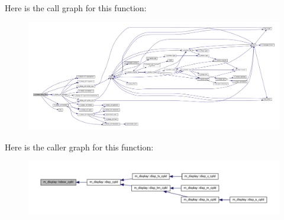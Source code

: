 Here is the call graph for this function\+:
\nopagebreak
\begin{figure}[H]
\begin{center}
\leavevmode
\includegraphics[width=350pt]{namespacem__display_ac4ed462092efa64e5ce8454e7a752d10_cgraph}
\end{center}
\end{figure}
Here is the caller graph for this function\+:
\nopagebreak
\begin{figure}[H]
\begin{center}
\leavevmode
\includegraphics[width=350pt]{namespacem__display_ac4ed462092efa64e5ce8454e7a752d10_icgraph}
\end{center}
\end{figure}
\mbox{\label{namespacem__display_a95571f3e4015bb187bcc1785c76013f9}} 

